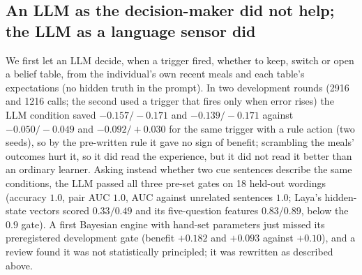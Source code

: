 \documentclass[11pt]{article}
\begin{document}
\subsection{An LLM as the decision-maker did not help; the LLM as a language sensor did}
We first let an LLM decide, when a trigger fired, whether to keep, switch or open a belief table, from the individual's own recent meals and each table's expectations (no hidden truth in the prompt). In two development rounds (2916 and 1216 calls; the second used a trigger that fires only when error rises) the LLM condition saved $-0.157/-0.171$ and $-0.139/-0.171$ against $-0.050/-0.049$ and $-0.092/+0.030$ for the same trigger with a rule action (two seeds), so by the pre-written rule it gave no sign of benefit; scrambling the meals' outcomes hurt it, so it did read the experience, but it did not read it better than an ordinary learner. Asking instead whether two cue sentences describe the same conditions, the LLM passed all three pre-set gates on 18 held-out wordings (accuracy $1.0$, pair AUC $1.0$, AUC against unrelated sentences $1.0$; Laya's hidden-state vectors scored $0.33/0.49$ and its five-question features $0.83/0.89$, below the $0.9$ gate). A first Bayesian engine with hand-set parameters just missed its preregistered development gate (benefit $+0.182$ and $+0.093$ against $+0.10$), and a review found it was not statistically principled; it was rewritten as described above.
\end{document}

